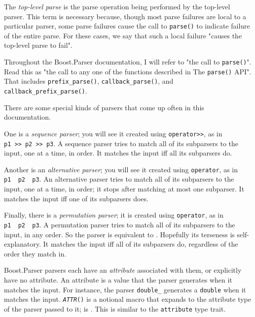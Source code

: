 \documentclass{MyBook}
\begin{document}
The \emph{top-level parse} is the parse operation being performed by the top-level parser. This term is necessary because, though most parse failures are local to a particular parser, some parse failures cause the call to \texttt{parse()} to indicate failure of the entire parse. For these cases, we say that such a local failure "causes the top-level parse to fail".

Throughout the Boost.Parser documentation, I will refer to "the call to \texttt{parse()}". Read this as "the call to any one of the functions described in The \texttt{parse()} API". That includes \texttt{prefix\_parse()}, \texttt{callback\_parse()}, and \texttt{callback\_prefix\_parse()}.

There are some special kinds of parsers that come up often in this documentation.

One is a \emph{sequence parser}; you will see it created using \texttt{operator>>}, as in \texttt{p1\ >>\ p2\ >>\ p3}. A sequence parser tries to match all of its subparsers to the input, one at a time, in order. It matches the input iff all its subparsers do.

Another is an \emph{alternative parser}; you will see it created using \texttt{operator\textbar{}}, as in \texttt{p1\ \textbar{}\ p2\ \textbar{}\ p3}. An alternative parser tries to match all of its subparsers to the input, one at a time, in order; it stops after matching at most one subparser. It matches the input iff one of its subparsers does.

Finally, there is a \emph{permutation parser}; it is created using \texttt{operator\textbar{}\textbar{}}, as in \texttt{p1\ \textbar{}\textbar{}\ p2\ \textbar{}\textbar{}\ p3}. A permutation parser tries to match all of its subparsers to the input, in any order. So the parser  is equivalent to . Hopefully its terseness is self-explanatory. It matches the input iff all of its subparsers do, regardless of the order they match in.

Boost.Parser parsers each have an \emph{attribute} associated with them, or explicitly have no attribute. An attribute is a value that the parser generates when it matches the input. For instance, the parser \texttt{double\_} generates a \texttt{double} when it matches the input. \emph{\texttt{ATTR}}\texttt{()} is a notional macro that expands to the attribute type of the parser passed to it;  is . This is similar to the \texttt{attribute} type trait.
\end{document}
